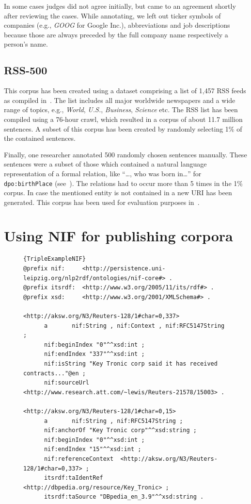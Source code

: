 In some cases judges did not agree initially, but came to an agreement shortly after reviewing the cases.
While annotating, we left out ticker symbols of companies (e.g., \textit{GOOG} for Google Inc.), abbreviations and job descriptions because those are always preceded by the full company name respectively a person's name.


\subsection{RSS-500}

This corpus has been created using a dataset comprising a list of 1,457 RSS feeds as compiled in~\cite{GOLDHAHN12.327}.
The list includes all major worldwide newspapers and a wide range of topics, e.g., \emph{World}, \emph{U.S.}, \emph{Business}, \emph{Science} etc.
The RSS list has been compiled using a 76-hour crawl, which resulted in a corpus of about 11.7 million sentences.
A subset of this corpus has been created by randomly selecting 1\% of the contained sentences.
 
Finally, one researcher annotated 500 randomly chosen sentences manually.
These sentences were a subset of those which contained a natural language representation of a formal relation, like ``\ldots, who was born in\ldots '' for \texttt{dpo:birthPlace} (see~\cite{conf/ekaw/GerberN12}).
The relations had to occur more than 5 times in the 1\% corpus. %
In case the mentioned entity is not contained in a new URI has been generated.
This corpus has been used for evaluation purposes in~\cite{GER+13}.

\section{Using NIF for publishing corpora}
\label{NIF}



\begin{figure}[t!]
\begin{lstlisting}[label=TripleExampleNIF,caption=example of the resulting N3-triples.]{TripleExampleNIF}
@prefix nif:     <http://persistence.uni-leipzig.org/nlp2rdf/ontologies/nif-core#> .
@prefix itsrdf:  <http://www.w3.org/2005/11/its/rdf#> .
@prefix xsd:     <http://www.w3.org/2001/XMLSchema#> .

<http://aksw.org/N3/Reuters-128/1#char=0,337>
      a       nif:String , nif:Context , nif:RFC5147String ;
      nif:beginIndex "0"^^xsd:int ;
      nif:endIndex "337"^^xsd:int ;
      nif:isString "Key Tronic corp said it has received contracts..."@en ;
      nif:sourceUrl <http://www.research.att.com/~lewis/Reuters-21578/15003> .

<http://aksw.org/N3/Reuters-128/1#char=0,15>
      a       nif:String , nif:RFC5147String ;
      nif:anchorOf "Key Tronic corp"^^xsd:string ;
      nif:beginIndex "0"^^xsd:int ;
      nif:endIndex "15"^^xsd:int ;
      nif:referenceContext  <http://aksw.org/N3/Reuters-128/1#char=0,337> ;
      itsrdf:taIdentRef <http://dbpedia.org/resource/Key_Tronic> ;
      itsrdf:taSource "DBpedia_en_3.9"^^xsd:string .
\end{lstlisting}
\end{figure}




